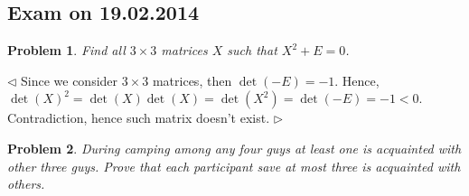 \documentclass[12pt]{article}
\newtheorem{problem}{Problem}[subsection]
\newenvironment{solution}{\par $\triangleleft$}{$\triangleright$}
\begin{document}
 
 
 
\newpage
 
\subsection{Exam on 19.02.2014}
 
\begin{problem} Find all $3\times 3$ matrices $X$ such that $X^2+E=0$. 
\end{problem}
\begin{solution} Since we consider $3\times 3$ matrices, then $\det(-E)=-1$. Hence, $\det(X)^2=\det(X)\det(X)=\det(X^2)=\det(-E)=-1<0$. Contradiction, hence such matrix doesn't exist.
\end{solution}
 
\begin{problem} During camping among any four guys at least one is acquainted with other three guys. Prove that each participant save at most three is acquainted with others.
\end{problem}
\end{document}
